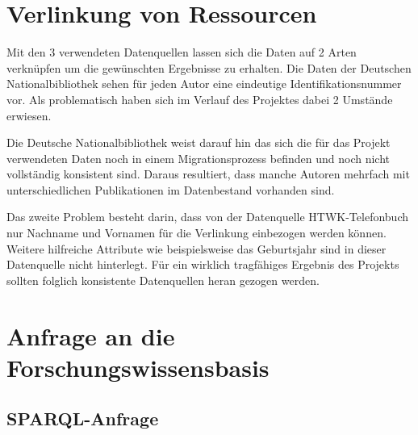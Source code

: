\documentclass[parskip]{scrartcl}
\begin{document}
\section{Verlinkung von Ressourcen}

Mit den 3 verwendeten Datenquellen lassen sich die Daten auf 2 Arten verknüpfen um die gewünschten Ergebnisse zu erhalten. Die Daten der Deutschen Nationalbibliothek sehen für jeden Autor eine eindeutige Identifikationsnummer vor. Als problematisch haben sich im Verlauf des Projektes dabei 2 Umstände erwiesen. 

Die Deutsche Nationalbibliothek weist darauf hin das sich die für das Projekt verwendeten Daten noch in einem Migrationsprozess befinden und noch nicht vollständig konsistent sind. Daraus resultiert, dass manche Autoren mehrfach mit unterschiedlichen Publikationen im Datenbestand vorhanden sind. 

Das zweite Problem besteht darin, dass von der Datenquelle HTWK-Telefonbuch nur Nachname und Vornamen für die Verlinkung einbezogen werden können. Weitere hilfreiche Attribute wie beispielsweise das Geburtsjahr sind in dieser Datenquelle nicht hinterlegt. Für ein wirklich tragfähiges Ergebnis des Projekts sollten folglich konsistente Datenquellen heran gezogen werden.

\section{Anfrage an die Forschungswissensbasis}

\subsection{SPARQL-Anfrage}
\end{document}
